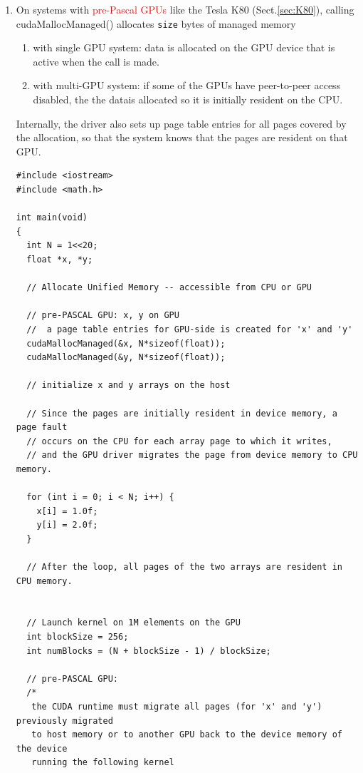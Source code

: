 \begin{enumerate}
  
  \item   On systems with \textcolor{red}{pre-Pascal GPUs} like the Tesla K80
  (Sect.\ref{sec:K80}), calling cudaMallocManaged() allocates \verb!size! bytes
  of managed memory 
  \begin{enumerate}
    \item with single GPU system: data is allocated  on the GPU device that is active when the call is made.
    
    \item with multi-GPU system: if some of the GPUs have peer-to-peer access disabled, the the 
    datais allocated so it is initially resident on the CPU.
    
  \end{enumerate}
  
  Internally, the driver also sets up page table entries for all pages covered
  by the allocation, so that the system knows that the pages are resident on
  that GPU.

\begin{lstlisting}
#include <iostream>
#include <math.h>
 
int main(void)
{
  int N = 1<<20;
  float *x, *y;
 
  // Allocate Unified Memory -- accessible from CPU or GPU
  
  // pre-PASCAL GPU: x, y on GPU
  //  a page table entries for GPU-side is created for 'x' and 'y'
  cudaMallocManaged(&x, N*sizeof(float));
  cudaMallocManaged(&y, N*sizeof(float));
 
  // initialize x and y arrays on the host
  
  // Since the pages are initially resident in device memory, a page fault
  // occurs on the CPU for each array page to which it writes, 
  // and the GPU driver migrates the page from device memory to CPU memory.
  
  for (int i = 0; i < N; i++) {
    x[i] = 1.0f;
    y[i] = 2.0f;
  }
  
  // After the loop, all pages of the two arrays are resident in CPU memory.
  
   
  // Launch kernel on 1M elements on the GPU
  int blockSize = 256;
  int numBlocks = (N + blockSize - 1) / blockSize;
  
  // pre-PASCAL GPU:
  /*
   the CUDA runtime must migrate all pages (for 'x' and 'y') previously migrated
   to host memory or to another GPU back to the device memory of the device
   running the following kernel
   

\end{lstlisting}
\end{enumerate}
